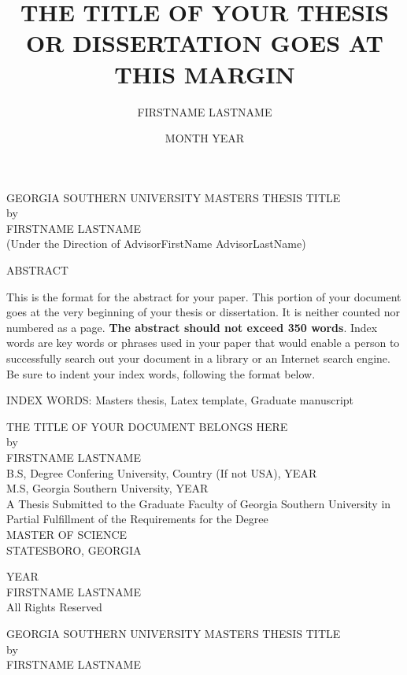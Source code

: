 \documentclass[11pt]{report}
\title{THE TITLE OF YOUR THESIS OR DISSERTATION GOES AT THIS MARGIN}
\author{FIRSTNAME LASTNAME}
\date{MONTH YEAR}
\begin{document}
\begin{titlepage}
\begin{center}
\uppercase{Georgia Southern University Masters Thesis Title} \\
\bigskip
by \\
\bigskip
\uppercase{FirstName LastName} \\
\bigskip
(Under the Direction of AdvisorFirstName AdvisorLastName)
\bigskip
\end{center}
\begin{center}
\uppercase{Abstract}
\end{center}
This is the format for the abstract for your paper. This portion of your document goes at the very beginning of your thesis or dissertation. It is neither counted nor numbered as a page. \textbf{The abstract should not exceed 350 words}. Index words are key words or phrases used in your paper that would enable a person to successfully search out your document in a library or an Internet search engine. Be sure to indent your index words, following the format below. 

\bigskip
\noindent
\uppercase{Index Words}: Masters thesis, Latex template, Graduate manuscript
\end{titlepage}

\newpage
\begin{center}
\uppercase{The Title of Your Document Belongs Here} \\
\bigskip
by \\
\bigskip
\uppercase{FirstName LastName} \\
\bigskip
B.S, Degree Confering University, Country (If not USA), YEAR \\
M.S, Georgia Southern University, YEAR \\
\bigskip
A Thesis Submitted to the Graduate Faculty of Georgia Southern University in Partial Fulfillment of the Requirements for the Degree \\
\bigskip
\uppercase{MASTER OF SCIENCE} \\
\bigskip
\uppercase{STATESBORO, GEORGIA}
\end{center}

\newpage
\null\vfill
\begin{center}
\textcopyright \space YEAR \\
\bigskip
\uppercase{FirstName LastName} \\
\bigskip
All Rights Reserved
\end{center}

\newpage
\begin{center}
\uppercase{Georgia Southern University Masters Thesis Title} \\
\bigskip
by \\
\bigskip
\uppercase{FirstName LastName} \\
\end{center}
\end{document}
